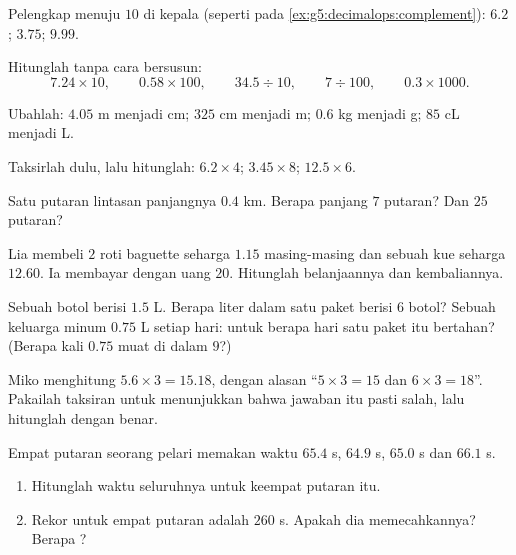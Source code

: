 \begin{exercise}[$\star$]\label{exo:g5:decimalops:3}
Pelengkap menuju $10$ di kepala (seperti pada
\cref{ex:g5:decimalops:complement}): $6.2$; \quad $3.75$; \quad
$9.99$.
\end{exercise}

\begin{exercise}[$\star$]\label{exo:g5:decimalops:4}
Hitunglah tanpa cara bersusun:
\[
7.24 \times 10, \qquad
0.58 \times 100, \qquad
34.5 \div 10, \qquad
7 \div 100, \qquad
0.3 \times 1000 .
\]
\end{exercise}

\begin{exercise}[$\star$]\label{exo:g5:decimalops:5}
Ubahlah: $4.05$ m menjadi cm; \quad $325$ cm menjadi m; \quad $0.6$
kg menjadi g; \quad $85$ cL menjadi L.
\end{exercise}

\begin{exercise}[$\star$]\label{exo:g5:decimalops:6}
Taksirlah dulu, lalu hitunglah: $6.2 \times 4$; \quad
$3.45 \times 8$; \quad $12.5 \times 6$.
\end{exercise}

\begin{exercise}[$\star$]\label{exo:g5:decimalops:7}
Satu putaran lintasan panjangnya $0.4$ km. Berapa panjang $7$
putaran? Dan $25$ putaran?
\end{exercise}

\begin{exercise}[$\star$]\label{exo:g5:decimalops:8}
Lia membeli $2$ roti baguette seharga $1.15$ masing-masing dan
sebuah kue seharga $12.60$. Ia membayar dengan uang $20$. Hitunglah  belanjaannya dan kembaliannya.
\end{exercise}

\begin{exercise}[$\star$]\label{exo:g5:decimalops:9}
Sebuah botol berisi $1.5$ L. Berapa liter dalam satu paket berisi
$6$ botol? Sebuah keluarga minum $0.75$ L setiap hari: untuk berapa
hari satu paket itu bertahan? (Berapa kali $0.75$ muat di dalam $9$?)
\end{exercise}

\begin{exercise}[$\star\star$]\label{exo:g5:decimalops:10}
Miko menghitung $5.6 \times 3 = 15.18$, dengan alasan
``$5 \times 3 = 15$ dan $6 \times 3 = 18$''. Pakailah taksiran untuk
menunjukkan bahwa jawaban itu pasti salah, lalu hitunglah dengan benar.
\end{exercise}

\begin{exercise}[$\star\star$]\label{exo:g5:decimalops:11}
Empat putaran seorang pelari memakan waktu $65.4$ s, $64.9$ s,
$65.0$ s dan $66.1$ s.
\begin{enumerate}
  \item Hitunglah waktu seluruhnya untuk keempat putaran itu.
  \item Rekor untuk empat putaran adalah $260$ s. Apakah dia
        memecahkannya? Berapa ?

\end{enumerate}
\end{exercise}
